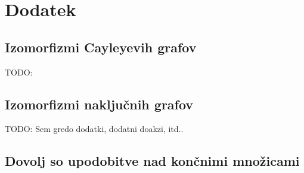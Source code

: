 \documentclass[mat2, tisk]{fmfdelo}
\newcommand{\TODO}[1]{{\color{blue} TODO: #1}}
\begin{document}
            \section{Dodatek}
            \subsection{Izomorfizmi Cayleyevih grafov}
            \label{dodatek:cayley}
            \TODO{}

            \subsection{Izomorfizmi naključnih grafov}
            \label{dodatek:naključni grafi}
            \TODO{Sem gredo dodatki, dodatni doakzi, itd..}
            \subsection{Dovolj so upodobitve nad končnimi množicami}


\end{document}
